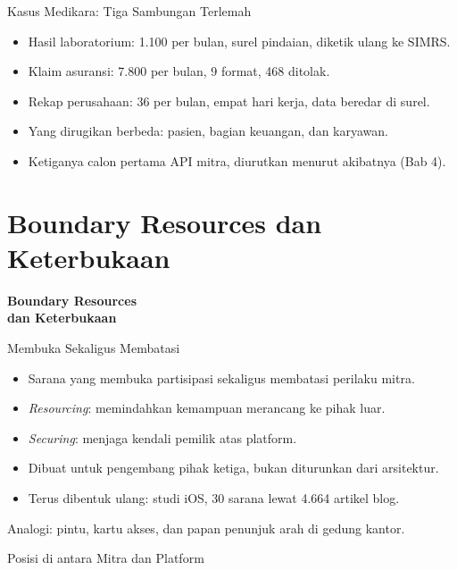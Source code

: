 \documentclass[aspectratio=169, table, 12pt]{beamer}
\begin{document}
\begin{frame}{{\Large Kasus Medikara: Tiga Sambungan Terlemah}}
  \vspace{10pt}
  \begin{itemize}
    \item Hasil laboratorium: 1.100 per bulan, surel pindaian, diketik ulang ke SIMRS.
    \item Klaim asuransi: 7.800 per bulan, 9 format, 468 ditolak.
    \item Rekap perusahaan: 36 per bulan, empat hari kerja, data beredar di surel.
    \item Yang dirugikan berbeda: pasien, bagian keuangan, dan karyawan.
    \item Ketiganya calon pertama API mitra, diurutkan menurut akibatnya (Bab 4).
  \end{itemize}
\end{frame}

\section{Boundary Resources dan Keterbukaan}

\begin{frame}{\hfill}
  \centering
  \Huge{\textbf{Boundary Resources\\dan Keterbukaan}}
\end{frame}

\begin{frame}{{\Large Membuka Sekaligus Membatasi}}
  \vspace{10pt}
  \begin{itemize}
    \item Sarana yang membuka partisipasi sekaligus membatasi perilaku mitra.
    \item \textit{Resourcing}: memindahkan kemampuan merancang ke pihak luar.
    \item \textit{Securing}: menjaga kendali pemilik atas platform.
    \item Dibuat untuk pengembang pihak ketiga, bukan diturunkan dari arsitektur.
    \item Terus dibentuk ulang: studi iOS, 30 sarana lewat 4.664 artikel blog.
  \end{itemize}
  \vspace{6pt}
  {\small Analogi: pintu, kartu akses, dan papan penunjuk arah di gedung kantor.}
\end{frame}

\begin{frame}{{\Large Posisi di antara Mitra dan Platform}}
  \centering
\end{frame}
\end{document}

